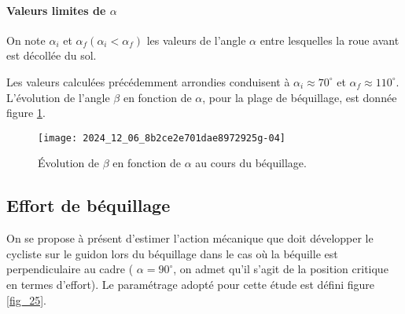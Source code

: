 


\paragraph*{Valeurs limites de \(\alpha\)} On note \(\alpha_{i}\) et \(\alpha_{f}\left(\alpha_{i}<\alpha_{f}\right)\) les valeurs de l'angle \(\alpha\) entre lesquelles la roue avant est décollée du sol.


Les valeurs calculées précédemment arrondies conduisent à \(\alpha_{i} \approx 70^{\circ}\) et \(\alpha_{f} \approx 110^{\circ}\). L'évolution de l'angle \(\beta\) en fonction de \(\alpha\), pour la plage de béquillage, est donnée figure \ref{fig_24}.


\begin{figure}[!htb]
\begin{center}
\texttt{[image: 2024\_12\_06\_8b2ce2e701dae8972925g-04]}
\caption{Évolution de \(\beta\) en fonction de \(\alpha\) au cours du béquillage. \label{fig_24}}
\end{center}
\end{figure}


\subsection{Effort de béquillage}
On se propose à présent d'estimer l'action mécanique que doit développer le cycliste sur le guidon lors du béquillage dans le cas où la béquille est perpendiculaire au cadre ( \(\alpha=90^{\circ}\), on admet qu'il s'agit de la position critique en termes d'effort). Le paramétrage adopté pour cette étude est défini figure \ref{fig_25}.\\

